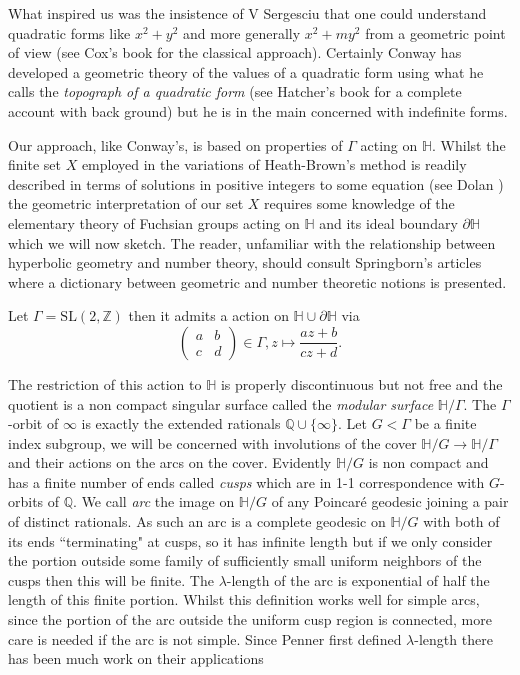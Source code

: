 \documentclass[12pt,a4paper]{amsart}
\def\dHH{\partial \mathbb{H}}
\def\ZZ{\mathbb{Z}}
\def\sl2{\mathrm{SL}(2, \ZZ)}
\begin{document}
What inspired us was the insistence of V Sergesciu that one could
understand quadratic forms like $x^2 +y^2$ and more generally $x^2 + my^2$
from a geometric point of view (see Cox's book \cite{cox} for the classical approach).
Certainly Conway \cite{conway} has developed a geometric theory of 
the values of a quadratic form using what he calls the
\textit{topograph of a quadratic form}
(see Hatcher's book \cite{hatcher} for a complete account with back
ground)
but he is in the main concerned with indefinite forms.

Our approach, like Conway's, is based on properties of $\Gamma$ acting on $\mathbb{H}$.
Whilst the finite set $X$ employed in the variations of
Heath-Brown's method is readily described in terms of solutions
in positive integers to some equation (see  Dolan \cite{dolan}) 
the geometric interpretation of our set $X$ requires some knowledge
of the elementary theory of Fuchsian groups acting on $\mathbb{H}$ and
its ideal boundary $\partial \mathbb{H}$ which we will now sketch.
The reader, unfamiliar with the relationship between hyperbolic
geometry and number theory,
should consult Springborn's articles \cite{springborn1, springborn2}
where a dictionary between geometric and number theoretic notions is presented.

Let $\Gamma = \sl2$ then it admits a action on $\mathbb{H}\cup \dHH$ via
$$
\begin{pmatrix} a&b\\c&d \end{pmatrix} \in \Gamma,
z \mapsto \frac{az + b}{cz + d}.
$$

The restriction of this action to $\mathbb{H}$ is properly
discontinuous but not free and the quotient is a non compact singular surface
called the \textit{modular surface} $\mathbb{H}/\Gamma$.
The $\Gamma$-orbit of $\infty$ is exactly the extended rationals $\mathbb{Q}\cup \{\infty\}$.
Let $G<\Gamma$ be a finite index subgroup, we will be concerned with involutions of the cover
$\mathbb{H}/G\rightarrow \mathbb{H}/\Gamma$ and their actions on the arcs on the cover.
Evidently $\mathbb{H}/G$ is non compact and has a finite number of
ends called \textit{cusps} which are in 1-1 correspondence 
with  $G$-orbits of $\mathbb{Q}$.
We call \textit{arc} the image on $\mathbb{H}/G$ of any Poincaré geodesic joining  a pair of distinct rationals.
As such an arc is a complete geodesic on  $\mathbb{H}/G$ with both
of its ends ``terminating" at cusps, 
so it has infinite length but if we only consider the portion outside some
family of sufficiently small uniform neighbors of the cusps then
this will be finite. 
The $\lambda$-length
of the arc is exponential of half the length of this finite portion.
Whilst this definition works well for simple arcs, 
since the portion of the arc
outside the uniform cusp region is connected, more care is needed if the arc is not simple.
Since Penner \cite{bob} first defined $\lambda$-length 
there has been much work on their applications
\end{document}
